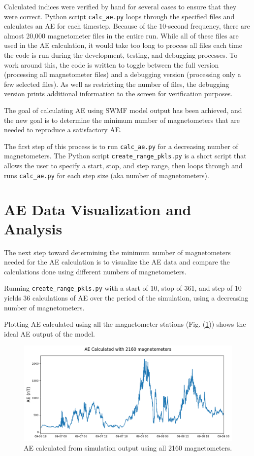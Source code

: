 \documentclass[12pt, letterpaper]{article}
\begin{document}
Calculated indices were verified by hand for several cases to ensure that they were correct. Python script \texttt{calc\_ae.py} loops through the specified files and calculates an AE for each timestep. Because of the 10-second frequency, there are almost 20,000 magnetometer files in the entire run. While all of these files are used in the AE calculation, it would take too long to process all files each time the code is run during the development, testing, and debugging processes. To work around this, the code is written to toggle between the full version (processing all magnetometer files) and a debugging version (processing only a few selected files). As well as restricting the number of files, the debugging version prints additional information to the screen for verification purposes.

The goal of calculating AE using SWMF model output has been achieved, and the new goal is to determine the minimum number of magnetometers that are needed to reproduce a satisfactory AE.

The first step of this process is to run \texttt{calc\_ae.py} for a decreasing number of magnetometers. The Python script \texttt{create\_range\_pkls.py} is a short script that allows the user to specify a start, stop, and step range, then loops through and runs \texttt{calc\_ae.py} for each step size (aka number of magnetometers).


\section{AE Data Visualization and Analysis} \label{vis}

The next step toward determining the minimum number of magnetometers needed for the AE calculation is to visualize the AE data and compare the calculations done using different numbers of magnetometers.

Running \texttt{create\_range\_pkls.py} with a start of 10, stop of 361, and step of 10 yields 36 calculations of AE over the period of the simulation, using a decreasing number of magnetometers.

Plotting AE calculated using all the magnetometer stations (Fig. (\ref{fig:360})) shows the ideal AE output of the model.

\begin{figure}[!ht]
  \centering
  \includegraphics[width=14cm]{../ae_plots_LaTeX/ae_2160.png}
  \caption{AE calculated from simulation output using all 2160 magnetometers.}
  \label{fig:360}
\end{figure}
\end{document}
